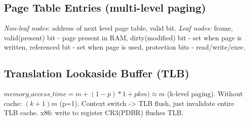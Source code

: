 \subsection*{Page Table Entries (multi-level paging)}
\emph{Non-leaf nodes:} address of next level page table, valid bit. \emph{Leaf nodes:} frame, valid(present) bit - page present in RAM, dirty(modified) bit - set when page is written, referenced bit - set when page is used, protection bits - read/write/exec.

\subsection*{Translation Lookaside Buffer (TLB)}
$memory\_access\_time=m+(1-p) \ast 1+pkm) \approx m$ (k-level paging). Without cache: $(k+1)m$ (p=1). Context switch -> TLB flush, just invalidate entire TLB cache. x86: write to register CR3(PDBR) flushes TLB.